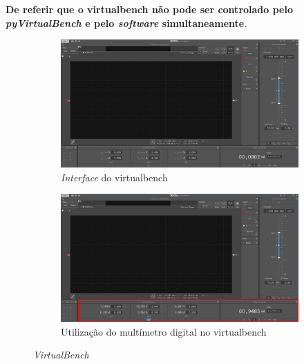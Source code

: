 \vspace{0.5cm}
\textbf{De referir que o \acrshort{virtualbench} não pode ser controlado pelo \textit{pyVirtualBench} e pelo \textit{software} simultaneamente}.
\vspace{0.5cm}

\begin{figure}
     \centering
     \begin{subfigure}[b]{1\textwidth}
         \centering
         \includegraphics[width=\textwidth]{figures/VB8012-Desktop.png}
         \caption{\textit{Interface} do \acrshort{virtualbench}}
         \label{fig:interfaceVB}
     \end{subfigure}
     \hfill
     \begin{subfigure}[b]{1\textwidth}
         \centering
         \includegraphics[width=\textwidth]{figures/VB8012-OHM_Exemplo.png}
         \caption{Utilização do multímetro digital no \acrshort{virtualbench}}  
         \label{fig:leituraohm}
     \end{subfigure}
     \hfill
    \caption{\textit{VirtualBench}}
    \label{fig:VB_OHM_Exemplo}
\end{figure}

